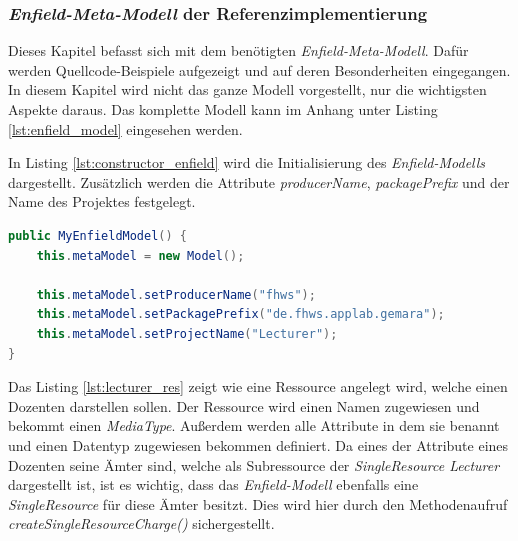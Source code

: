 \subsubsection{\textit{Enfield-Meta-Modell} der Referenzimplementierung} \label{sec:enfield_intro}
Dieses Kapitel befasst sich mit dem benötigten \textit{Enfield-Meta-Modell}. Dafür werden Quellcode-Beispiele aufgezeigt und auf deren Besonderheiten eingegangen. In diesem Kapitel wird nicht das ganze Modell vorgestellt, nur die wichtigsten Aspekte daraus. Das komplette Modell kann im Anhang unter Listing \ref{lst:enfield_model} eingesehen werden.

In Listing \ref{lst:constructor_enfield} wird die Initialisierung des \textit{Enfield-Modells} dargestellt. Zusätzlich werden die Attribute \textit{producerName}, \textit{packagePrefix} und der Name des Projektes festgelegt.

\begin{lstlisting}[label=lst:constructor_enfield,
language=java,
firstnumber=1,
caption=Initialisierung des \textit{Enfield-Meta-Modells}.]	
public MyEnfieldModel() {
	this.metaModel = new Model();

	this.metaModel.setProducerName("fhws");
	this.metaModel.setPackagePrefix("de.fhws.applab.gemara");
	this.metaModel.setProjectName("Lecturer");
}
\end{lstlisting}

Das Listing \ref{lst:lecturer_res} zeigt wie eine Ressource angelegt wird, welche einen Dozenten darstellen sollen. Der Ressource wird einen Namen zugewiesen und bekommt einen \textit{MediaType}. Außerdem werden alle Attribute in dem sie benannt und einen Datentyp zugewiesen bekommen definiert.
 Da eines der Attribute eines Dozenten seine Ämter sind, welche als Subressource der \textit{SingleResource Lecturer} dargestellt ist, ist es wichtig, dass das \textit{Enfield-Modell} ebenfalls eine \textit{SingleResource} für diese Ämter besitzt. Dies wird hier durch den Methodenaufruf \textit{createSingleResourceCharge()} sichergestellt.

\newpage

